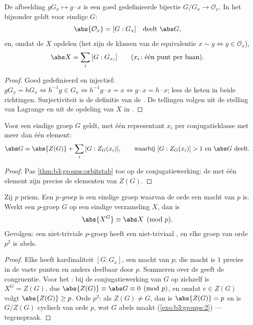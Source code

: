 \begin{theorem}\label{thm:b3:groups:orbitstab}
De afbeelding $gG_x \mapsto g \cdot x$ is een goed gedefinieerde
bijectie $G/G_x \to \mathcal O_x$. In het bijzonder geldt voor
eindige $G$:
\[
\abs{\mathcal O_x} = [G : G_x] \quad\text{deelt } \abs G,
\]
en, omdat de  $X$ opdelen (het zijn de klassen van de
equivalentie $x \sim y \iff y \in \mathcal O_x$),
\[
\abs X = \sum_{i} \,[G : G_{x_i}]
\qquad (x_i\colon \text{één punt per baan}).
\]
\end{theorem}

\begin{proof}
Goed gedefinieerd en injectief: $gG_x = hG_x \iff h^{-1}g \in G_x
\iff h^{-1}g \cdot x = x \iff g \cdot x = h \cdot x$; lees de keten
in beide richtingen. Surjectiviteit is de definitie van de . De
tellingen volgen uit de stelling van Lagrange en uit de opdeling
van $X$ in .
\end{proof}

\begin{corollary}[Klassevergelijking]\label{cor:b3:groups:classeq}
Voor een eindige groep $G$ geldt, met één representant $x_i$ per
conjugatieklasse met meer dan één element:
\[
\abs G = \abs{Z(G)} + \sum_i \,[G : Z_G(x_i)],
\qquad\text{waarbij } [G : Z_G(x_i)] > 1 \text{ en } \abs G \text{
deelt.}
\]
\end{corollary}

\begin{proof}
Pas \cref{thm:b3:groups:orbitstab} toe op de conjugatiewerking: de
 met één element zijn precies de elementen van $Z(G)$.
\end{proof}

\begin{theorem}\label{thm:b3:groups:pfixed}
Zij $p$ priem. Een \emph{$p$-groep} is een
eindige groep waarvan de orde een macht van $p$ is. Werkt een
$p$-groep $G$ op een eindige verzameling $X$, dan is
\[
\abs{X^G} \equiv \abs X \pmod p .
\]
Gevolgen: een niet-triviale $p$-groep heeft een niet-triviaal
, en elke groep van orde $p^2$ is abels.
\end{theorem}

\begin{proof}
Elke  heeft kardinaliteit $[G:G_x]$, een macht van $p$; die
macht is $1$ precies in de vaste punten en anders deelbaar door
$p$. Sommeren over de  geeft de congruentie. Voor het :
bij de conjugatiewerking van $G$ op zichzelf is $X^G = Z(G)$, dus
$\abs{Z(G)} \equiv \abs G \equiv 0 \pmod p$, en omdat $e \in Z(G)$
volgt $\abs{Z(G)} \geq p$. Orde $p^2$: als $Z(G) \neq G$, dan is
$\abs{Z(G)} = p$ en is $G/Z(G)$ cyclisch van orde $p$, wat $G$
abels maakt (\cref{exo:b3:groups:2}) --- tegenspraak.
\end{proof}

